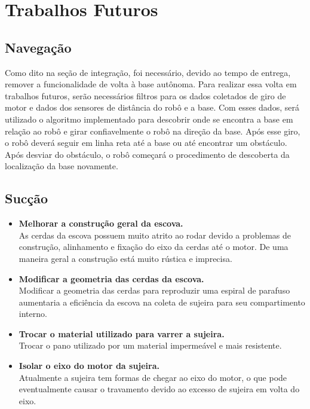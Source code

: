 \section{Trabalhos Futuros}

\subsection{Navegação}

Como dito na seção de integração, foi necessário, devido ao tempo de entrega, remover a funcionalidade de volta à base autônoma. Para realizar essa volta em trabalhos futuros, serão necessários filtros para os dados coletados de giro de motor e dados dos sensores de distância do robô e a base. Com esses dados, será utilizado o algoritmo implementado para descobrir onde se encontra a base em relação ao robô e girar confiavelmente o robô na direção da base. Após esse giro, o robô deverá seguir em linha reta até a base ou até encontrar um obstáculo. Após desviar do obstáculo, o robô começará o procedimento de descoberta da localização da base novamente.

\subsection{Sucção}

\begin{itemize}
   \item \textbf{Melhorar a construção geral da escova.}\\
    As cerdas da escova possuem muito atrito ao rodar devido a problemas de construção, alinhamento e fixação do eixo da cerdas até o motor. De uma maneira geral a construção está muito rústica e imprecisa.

    \item \textbf{Modificar a geometria das cerdas da escova.}\\
    Modificar a geometria das cerdas para reproduzir uma espiral de parafuso aumentaria a eficiência da escova na coleta de sujeira para seu compartimento interno.


  \item \textbf{Trocar o material utilizado para varrer a sujeira.}\\
  Trocar o pano utilizado por um material impermeável e mais resistente.


  \item \textbf{Isolar o eixo do motor da sujeira.}\\
  Atualmente a sujeira tem formas de chegar ao eixo do motor, o que pode eventualmente causar o travamento devido ao excesso de sujeira em volta do eixo.

\end{itemize}
